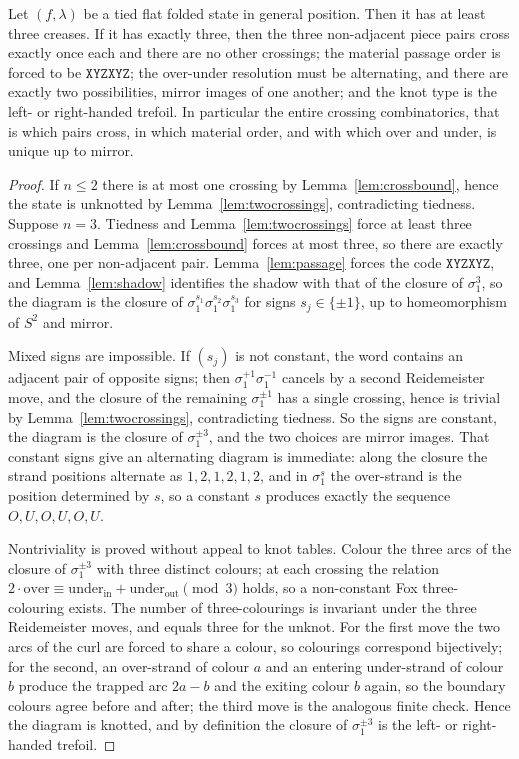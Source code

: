 \begin{theorem}\label{thm:foldnumber}
Let $(f,\lambda)$ be a tied flat folded state in general position. Then it has at least three creases. If it has exactly three, then the three non-adjacent piece pairs cross exactly once each and there are no other crossings; the material passage order is forced to be $\mathtt{XYZXYZ}$; the over-under resolution must be alternating, and there are exactly two possibilities, mirror images of one another; and the knot type is the left- or right-handed trefoil. In particular the entire crossing combinatorics, that is which pairs cross, in which material order, and with which over and under, is unique up to mirror.
\end{theorem}

\begin{proof}
If $n\le2$ there is at most one crossing by Lemma~\ref{lem:crossbound}, hence the state is unknotted by Lemma~\ref{lem:twocrossings}, contradicting tiedness. Suppose $n=3$. Tiedness and Lemma~\ref{lem:twocrossings} force at least three crossings and Lemma~\ref{lem:crossbound} forces at most three, so there are exactly three, one per non-adjacent pair. Lemma~\ref{lem:passage} forces the code $\mathtt{XYZXYZ}$, and Lemma~\ref{lem:shadow} identifies the shadow with that of the closure of $\sigma_1^3$, so the diagram is the closure of $\sigma_1^{s_1}\sigma_1^{s_2}\sigma_1^{s_3}$ for signs $s_j\in\{\pm1\}$, up to homeomorphism of $S^2$ and mirror.

Mixed signs are impossible. If $(s_j)$ is not constant, the word contains an adjacent pair of opposite signs; then $\sigma_1^{+1}\sigma_1^{-1}$ cancels by a second Reidemeister move, and the closure of the remaining $\sigma_1^{\pm1}$ has a single crossing, hence is trivial by Lemma~\ref{lem:twocrossings}, contradicting tiedness. So the signs are constant, the diagram is the closure of $\sigma_1^{\pm3}$, and the two choices are mirror images. That constant signs give an alternating diagram is immediate: along the closure the strand positions alternate as $1,2,1,2,1,2$, and in $\sigma_1^{s}$ the over-strand is the position determined by $s$, so a constant $s$ produces exactly the sequence $O,U,O,U,O,U$.

Nontriviality is proved without appeal to knot tables. Colour the three arcs of the closure of $\sigma_1^{\pm3}$ with three distinct colours; at each crossing the relation $2\cdot\mathrm{over}\equiv\mathrm{under}_{\mathrm{in}}+\mathrm{under}_{\mathrm{out}}\pmod3$ holds, so a non-constant Fox three-colouring exists. The number of three-colourings is invariant under the three Reidemeister moves, and equals three for the unknot. For the first move the two arcs of the curl are forced to share a colour, so colourings correspond bijectively; for the second, an over-strand of colour $a$ and an entering under-strand of colour $b$ produce the trapped arc $2a-b$ and the exiting colour $b$ again, so the boundary colours agree before and after; the third move is the analogous finite check. Hence the diagram is knotted, and by definition the closure of $\sigma_1^{\pm3}$ is the left- or right-handed trefoil.
\end{proof}

